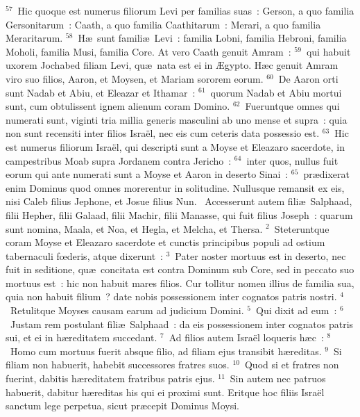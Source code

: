 ${}^{57}$~Hic quoque est numerus filiorum Levi per familias suas~: Gerson, a quo familia Gersonitarum~: Caath, a quo familia Caathitarum~: Merari, a quo familia Meraritarum.
${}^{58}$~H\ae\ sunt famili\ae\ Levi~: familia Lobni, familia Hebroni, familia Moholi, familia Musi, familia Core. At vero Caath genuit Amram~:
${}^{59}$~qui habuit uxorem Jochabed filiam Levi, qu\ae\ nata est ei in \AE gypto. H\ae c genuit Amram viro suo filios, Aaron, et Moysen, et Mariam sororem eorum.
${}^{60}$~De Aaron orti sunt Nadab et Abiu, et Eleazar et Ithamar~:
${}^{61}$~quorum Nadab et Abiu mortui sunt, cum obtulissent ignem alienum coram Domino.
${}^{62}$~Fueruntque omnes qui numerati sunt, viginti tria millia generis masculini ab uno mense et supra~: quia non sunt recensiti inter filios Isra\"el, nec eis cum ceteris data possessio est.
${}^{63}$~Hic est numerus filiorum Isra\"el, qui descripti sunt a Moyse et Eleazaro sacerdote, in campestribus Moab supra Jordanem contra Jericho~:
${}^{64}$~inter quos, nullus fuit eorum qui ante numerati sunt a Moyse et Aaron in deserto Sinai~:
${}^{65}$~pr\ae dixerat enim Dominus quod omnes morerentur in solitudine. Nullusque remansit ex eis, nisi Caleb filius Jephone, et Josue filius Nun.
~Accesserunt autem fili\ae\ Salphaad, filii Hepher, filii Galaad, filii Machir, filii Manasse, qui fuit filius Joseph~: quarum sunt nomina, Maala, et Noa, et Hegla, et Melcha, et Thersa.
${}^{2}$~Steteruntque coram Moyse et Eleazaro sacerdote et cunctis principibus populi ad ostium tabernaculi fœderis, atque dixerunt~:
${}^{3}$~Pater noster mortuus est in deserto, nec fuit in seditione, qu\ae\ concitata est contra Dominum sub Core, sed in peccato suo mortuus est~: hic non habuit mares filios. Cur tollitur nomen illius de familia sua, quia non habuit filium~? date nobis possessionem inter cognatos patris nostri.
${}^{4}$~Retulitque Moyses causam earum ad judicium Domini.
${}^{5}$~Qui dixit ad eum~:
${}^{6}$~Justam rem postulant fili\ae\ Salphaad~: da eis possessionem inter cognatos patris sui, et ei in h\ae reditatem succedant.
${}^{7}$~Ad filios autem Isra\"el loqueris h\ae c~:
${}^{8}$~Homo cum mortuus fuerit absque filio, ad filiam ejus transibit h\ae reditas.
${}^{9}$~Si filiam non habuerit, habebit successores fratres suos.
${}^{10}$~Quod si et fratres non fuerint, dabitis h\ae reditatem fratribus patris ejus.
${}^{11}$~Sin autem nec patruos habuerit, dabitur h\ae reditas his qui ei proximi sunt. Eritque hoc filiis Isra\"el sanctum lege perpetua, sicut pr\ae cepit Dominus Moysi.


